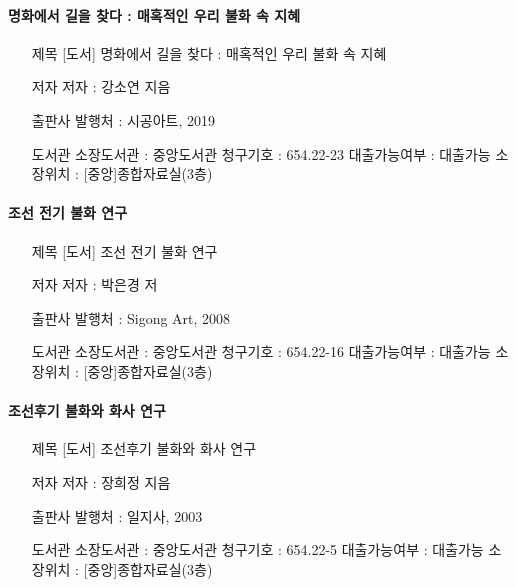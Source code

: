 \documentclass[12pt, a4paper, oneside]{book}
\begin{document}
\paragraph{ 명화에서 길을 찾다 : 매혹적인 우리 불화 속 지혜 }

\begin{itemize}[					
		topsep=0.0em,			
		parsep=0.0em,			
		itemsep=0em,			
		leftmargin=	5	em,
		labelwidth=	1	em,			
		labelsep=		1	 em			
]					
	\item	[제목]	[도서] 명화에서 길을 찾다 : 매혹적인 우리 불화 속 지혜	\item	[저자]	저자 : 강소연 지음	\item	[출판사]	발행처 : 시공아트, 2019	\item	[도서관]	소장도서관 : 중앙도서관	청구기호 : 654.22-23	대출가능여부 : 대출가능	소장위치 : [중앙]종합자료실(3층)

\end{itemize}					


\paragraph{ 조선 전기 불화 연구 }

\begin{itemize}[					
		topsep=0.0em,			
		parsep=0.0em,			
		itemsep=0em,			
		leftmargin=	5	em,
		labelwidth=	1	em,			
		labelsep=		1	 em			
]					
	\item	[제목]	[도서] 조선 전기 불화 연구	\item	[저자]	저자 : 박은경 저	\item	[출판사]	발행처 : Sigong Art, 2008	\item	[도서관]	소장도서관 : 중앙도서관	청구기호 : 654.22-16	대출가능여부 : 대출가능	소장위치 : [중앙]종합자료실(3층)

\end{itemize}					


\paragraph{ 조선후기 불화와 화사 연구 }

\begin{itemize}[					
		topsep=0.0em,			
		parsep=0.0em,			
		itemsep=0em,			
		leftmargin=	5	em,
		labelwidth=	1	em,			
		labelsep=		1	 em			
]					
	\item	[제목]	[도서] 조선후기 불화와 화사 연구	\item	[저자]	저자 : 장희정 지음	\item	[출판사]	발행처 : 일지사, 2003	\item	[도서관]	소장도서관 : 중앙도서관	청구기호 : 654.22-5	대출가능여부 : 대출가능	소장위치 : [중앙]종합자료실(3층)

\end{itemize}					
\end{document}
